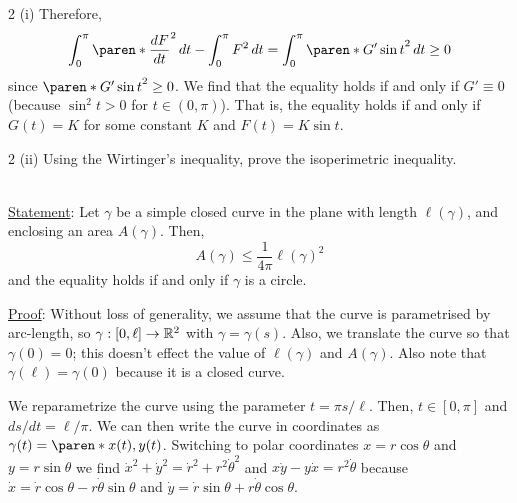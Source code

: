 \documentclass[11pt]{penrose}
\begin{document}
\begin{problem}{2 (i)}
    Therefore,
    \begin{equation*}
        \int_{0}^{\pi} \paren*{\frac{dF}{dt}}^2 \,dt
        - \int_{0}^{\pi} F^2 \,dt
        = \int_{0}^{\pi} \paren*{G' \sin t}^2 \,dt \geq 0
    \end{equation*}
    since $\paren*{G' \sin t}^2 \geq 0$. We find that the equality holds if and only if $G' \equiv 0$ (because $\sin^2 t > 0$ for $t \in (0, \pi)$). That is, the equality holds if and only if $G(t) = K$ for some constant $K$ and $F(t) = K \sin t$.
\end{problem}

\begin{problem}{2 (ii)}
    Using the Wirtinger's inequality, prove the isoperimetric inequality.

    \solution\\
    \underline{Statement}: Let $\gamma$ be a simple closed curve in the plane with length $\ell(\gamma)$, and enclosing an area $A(\gamma)$. Then,
        \begin{equation*}
            A(\gamma) \leq \frac{1}{4\pi} \ell(\gamma)^2
        \end{equation*}
        and the equality holds if and only if $\gamma$ is a circle.
    
    \underline{Proof}: Without loss of generality, we assume that the curve is parametrised by arc-length, so $\gamma : [0, \ell] \to \mathbb{R}^2$ with $\gamma = \gamma(s)$. Also, we translate the curve so that $\gamma(0) = 0$; this doesn't effect the value of $\ell(\gamma)$ and $A(\gamma)$. Also note that $\gamma(\ell) = \gamma(0)$ because it is a closed curve.

    We reparametrize the curve using the parameter $t = \pi s / \ell$. Then, $t \in [0, \pi]$ and $ds/dt = \ell/\pi$. We can then write the curve in coordinates as $\gamma(t) = \paren*{x(t), y(t)}$. Switching to polar coordinates $x = r \cos\theta$ and $y = r \sin\theta$ we find $\dot{x}^2 + \dot{y}^2 = \dot{r}^2 + r^2 \dot{\theta}^2$ and $x\dot{y} - y\dot{x} = r^2 \dot{\theta}$ because $\dot{x} = \dot{r} \cos\theta - r \dot{\theta} \sin\theta$ and $\dot{y} = \dot{r} \sin\theta + r \dot{\theta} \cos\theta$.


\end{problem}
\end{document}

